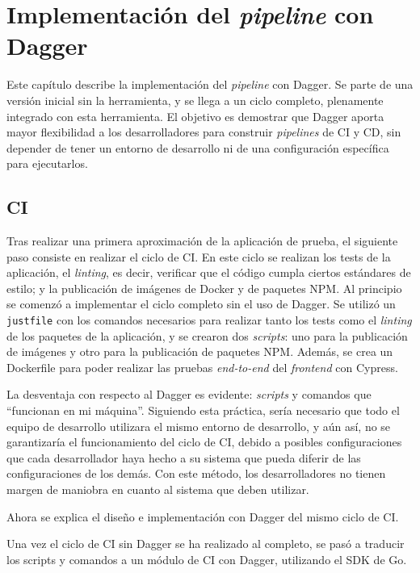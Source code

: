 \chapter{Implementación del \textit{pipeline} con Dagger}
\label{chap:dagger}

Este capítulo describe la implementación del \textit{pipeline} con Dagger. Se parte de una versión inicial sin la herramienta, y se llega a un ciclo completo, plenamente integrado con esta herramienta. El objetivo es demostrar que Dagger aporta mayor flexibilidad a los desarrolladores para construir \textit{pipelines} de CI y CD, sin depender de tener un entorno de desarrollo ni de una configuración específica para ejecutarlos.

\section{CI}
\label{sec:ci}

Tras realizar una primera aproximación de la aplicación de prueba, el siguiente paso consiste en realizar el ciclo de CI. En este ciclo se realizan los tests de la aplicación, el \textit{linting}, es decir, verificar que el código cumpla ciertos estándares de estilo; y la publicación de imágenes de Docker y de paquetes NPM. Al principio se comenzó a implementar el ciclo completo sin el uso de Dagger. Se utilizó un \texttt{justfile} con los comandos necesarios para realizar tanto los tests como el \textit{linting} de los paquetes de la aplicación, y se crearon dos \textit{scripts}: uno para la publicación de imágenes y otro para la publicación de paquetes NPM. Además, se crea un Dockerfile para poder realizar las pruebas \textit{end-to-end} del \textit{frontend} con Cypress\cite{cypress}.

La desventaja con respecto al Dagger es evidente: \textit{scripts} y comandos que ``funcionan en mi máquina''. Siguiendo esta práctica, sería necesario que todo el equipo de desarrollo utilizara el mismo entorno de desarrollo, y aún así, no se garantizaría el funcionamiento del ciclo de CI, debido a posibles configuraciones que cada desarrollador haya hecho a su sistema que pueda diferir de las configuraciones de los demás. Con este método, los desarrolladores no tienen margen de maniobra en cuanto al sistema que deben utilizar.

Ahora se explica el diseño e implementación con Dagger del mismo ciclo de CI.

Una vez el ciclo de CI sin Dagger se ha realizado al completo, se pasó a traducir los scripts y comandos a un módulo de CI con Dagger, utilizando el SDK de Go.

